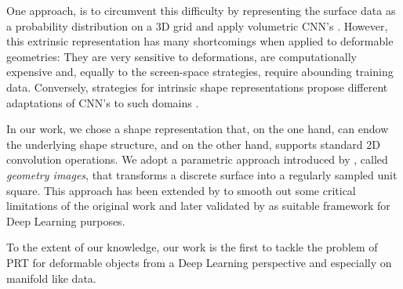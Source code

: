One approach, is to circumvent this difficulty by representing the surface data as a probability distribution on a  3D grid and apply volumetric CNN's \cite{3d_ShapeNets}. However, this extrinsic representation has many shortcomings when applied to deformable geometries: They are very sensitive to deformations, are computationally expensive and, equally to the screen-space strategies, require abounding training data. Conversely, strategies for intrinsic shape representations propose different adaptations of CNN's to such domains \cite{ShapeNet1, BoscainiMRB16, CNN_on_Torus}.

In our work, we chose a shape representation that, on the one hand, can endow the underlying shape structure, and on the other hand, supports standard 2D convolution operations. We adopt a parametric approach introduced by \cite{gu2002geometry}, called \textit{geometry images}, that transforms a discrete surface into a regularly sampled unit square. This approach has been extended by \cite{Spherical_Parametrization} to smooth out some critical limitations of the original work and later validated by \cite{sinha2016deep} as suitable framework for Deep Learning purposes.

To the extent of our knowledge, our work is the first to tackle the problem of PRT for deformable objects from a Deep Learning perspective and especially on manifold like data. 



